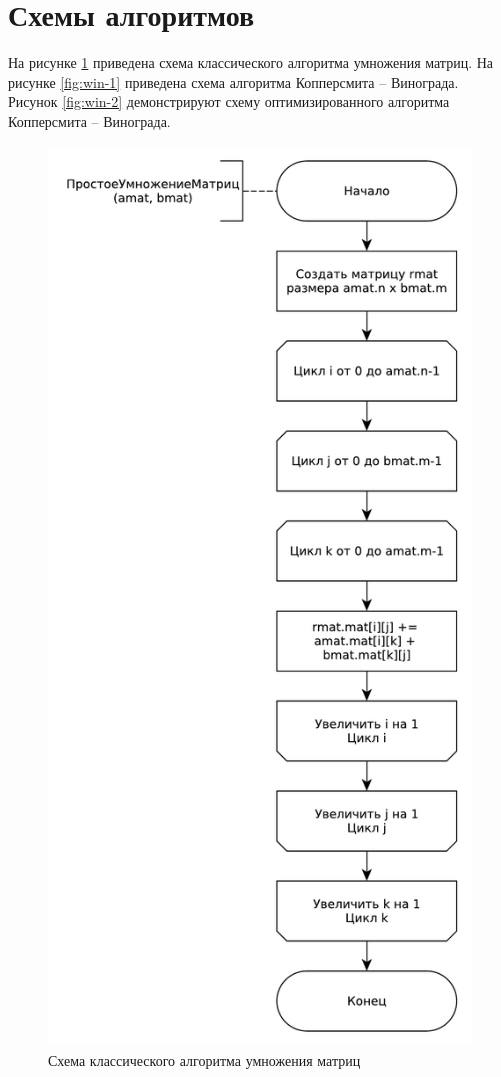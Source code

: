 \section{Схемы алгоритмов}
На рисунке \ref{fig:alg} приведена схема классического алгоритма умножения матриц. На рисунке \ref{fig:win-1} приведена схема алгоритма Копперсмита -- Винограда. Рисунок  
\ref{fig:win-2} демонстрируют схему оптимизированного алгоритма Копперсмита -- Винограда.\newpage

\begin{figure}[ht!]
	\centering
	\includegraphics[width=0.65\linewidth]{assets/mtx-alg.pdf}
	\caption{Схема классического алгоритма умножения матриц}
	\label{fig:alg}
\end{figure}

